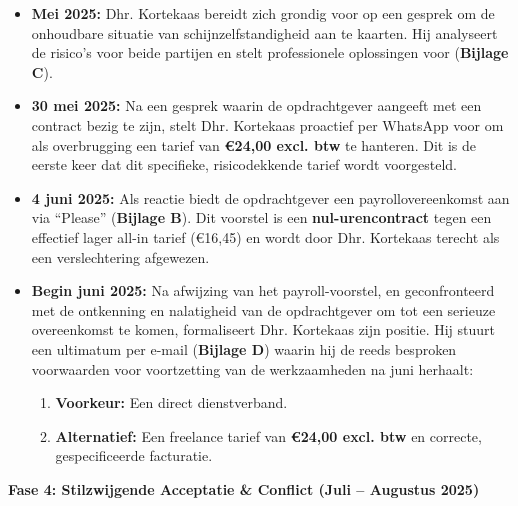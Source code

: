 \documentclass[10pt,a4paper]{article}
\begin{document}
\begin{adjustwidth}{15mm}{15mm}
\begin{itemize}
\item \textbf{Mei 2025:} Dhr. Kortekaas bereidt zich grondig voor op een gesprek om de onhoudbare situatie van schijnzelfstandigheid aan te kaarten. Hij analyseert de risico's voor beide partijen en stelt professionele oplossingen voor (\textbf{Bijlage C}).
\item \textbf{30 mei 2025:} Na een gesprek waarin de opdrachtgever aangeeft met een contract bezig te zijn, stelt Dhr. Kortekaas proactief per WhatsApp voor om als overbrugging een tarief van \textbf{€24,00 excl. btw} te hanteren. Dit is de eerste keer dat dit specifieke, risicodekkende tarief wordt voorgesteld.
\item \textbf{4 juni 2025:} Als reactie biedt de opdrachtgever een payrollovereenkomst aan via ``Please'' (\textbf{Bijlage B}). Dit voorstel is een \textbf{nul-urencontract} tegen een effectief lager all-in tarief (€16,45) en wordt door Dhr. Kortekaas terecht als een verslechtering afgewezen.
\item \textbf{Begin juni 2025:} Na afwijzing van het payroll-voorstel, en geconfronteerd met de ontkenning en nalatigheid van de opdrachtgever om tot een serieuze overeenkomst te komen, formaliseert Dhr. Kortekaas zijn positie. Hij stuurt een ultimatum per e-mail (\textbf{Bijlage D}) waarin hij de reeds besproken voorwaarden voor voortzetting van de werkzaamheden na juni herhaalt:
    \begin{enumerate}
    \item \textbf{Voorkeur:} Een direct dienstverband.
    \item \textbf{Alternatief:} Een freelance tarief van \textbf{€24,00 excl. btw} en correcte, gespecificeerde facturatie.
    \end{enumerate}
\end{itemize}

{\fontsize{10}{15}\selectfont\textbf{Fase 4: Stilzwijgende Acceptatie \& Conflict (Juli – Augustus 2025)}}


\end{adjustwidth}
\end{document}
